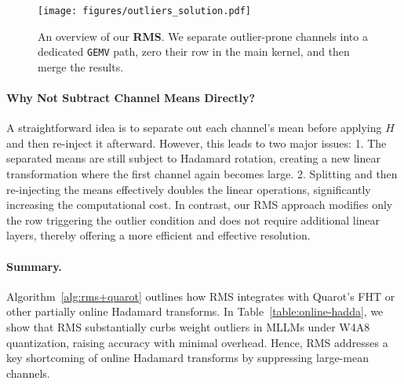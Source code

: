 \begin{figure}[ht]
    \centering    
    \texttt{[image: figures/outliers\_solution.pdf]}
    \vspace{-1mm}
    \caption{An overview of our \textbf{RMS}. We separate outlier-prone channels into a dedicated \texttt{GEMV} path, zero their row in the main kernel, and then merge the results.}
    \label{oswq}
    \vspace{-4mm}
\end{figure}

\paragraph{Why Not Subtract Channel Means Directly?}
A straightforward idea is to separate out each channel's mean before applying $H$ and then re-inject it afterward. However, this leads to two major issues: 1. The separated means are still subject to Hadamard rotation, creating a new linear transformation where the first channel again becomes large. 2. Splitting and then re-injecting the means effectively doubles the linear operations, significantly increasing the computational cost. In contrast, our RMS approach modifies only the row triggering the outlier condition and does not require additional linear layers, thereby offering a more efficient and effective resolution.

\vspace{-4mm}
\paragraph{Summary.} Algorithm~\ref{alg:rms+quarot} outlines how RMS integrates with Quarot’s FHT or other partially online Hadamard transforms. In Table~\ref{table:online-hadda}, we show that RMS substantially curbs weight outliers in MLLMs under W4A8 quantization, raising accuracy with minimal overhead. Hence, RMS addresses a key shortcoming of online Hadamard transforms by suppressing large-mean channels.